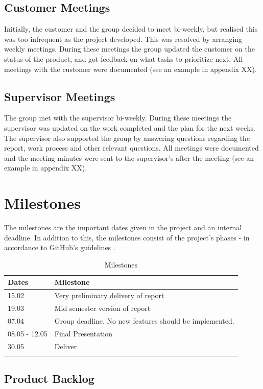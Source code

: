 \subsection{Customer Meetings}
Initially, the customer and the group decided to meet bi-weekly, but realised this was too infrequent as the project developed. This was resolved by arranging weekly meetings. During these meetings the group updated the customer on the status of the product, and got feedback on what tasks to prioritize next. All meetings with the customer were documented (see an example in appendix XX).


\subsection{Supervisor Meetings}
The group met with the supervisor bi-weekly. During these meetings the supervisor was updated on the work completed and the plan for the next weeks. The supervisor also supported the group by answering questions regarding the report, work process and other relevant questions. All meetings were documented and the meeting minutes were sent to the supervisor's after the meeting (see an example in appendix XX).


\section{Milestones}
\label{milestones}
The milestones are the important dates given in the project and an internal deadline. In addition to this, the milestones consist of the project's phases - in accordance to GitHub's guidelines \cite{GitHubGuide}. 

\begin{longtable}{|l|l|}
\hline
\rowcolor{Gray}
\textbf{Dates} & \textbf{Milestone} \\
\hline
15.02 & Very preliminary delivery of report \\
\hline
19.03 & Mid semester version of report\\
\hline
07.04 & Group deadline. No new features should be implemented. \\
\hline
08.05 - 12.05 & Final Presentation \\
\hline
30.05 & Deliver  \\
\hline
\caption{Milestones}
\end{longtable}

\subsection{Product Backlog}




\cleardoublepage